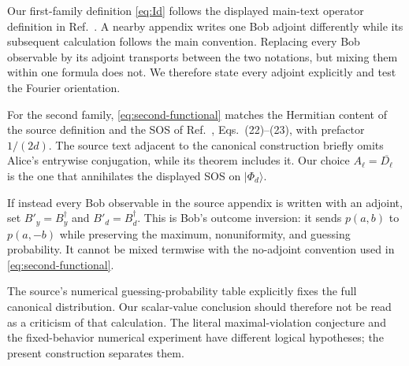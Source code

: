 \documentclass[11pt]{article}
\theoremstyle{definition}
\theoremstyle{remark}
\begin{document}
Our first-family definition \eqref{eq:Id} follows the displayed main-text
operator definition in Ref.~\cite{PeritoEtAl2026}.  A nearby appendix writes
one Bob adjoint differently while its subsequent calculation follows the
main convention.  Replacing every Bob observable by its adjoint transports
between the two notations, but mixing them within one formula does not.  We
therefore state every adjoint explicitly and test the Fourier orientation.

For the second family, \eqref{eq:second-functional} matches the Hermitian
content of the source definition and the SOS of
Ref.~\cite{PeritoEtAl2026}, Eqs.~(22)--(23), with prefactor \(1/(2d)\).
The source text adjacent to the canonical construction briefly omits Alice's
entrywise conjugation, while its theorem includes it.
Our choice \(A_\ell=\overline{D_\ell}\) is the one that annihilates the
displayed SOS on \(\lvert\Phi_d\rangle\).

If instead every Bob observable in the source appendix is written with an
adjoint, set \(B'_y=B_y^\dagger\) and \(B'_d=B_d^\dagger\).  This is Bob's
outcome inversion: it sends \(p(a,b)\) to \(p(a,-b)\) while preserving the
maximum, nonuniformity, and guessing probability.  It cannot be mixed
termwise with the no-adjoint convention used in
\eqref{eq:second-functional}.

The source's numerical guessing-probability table explicitly fixes the full
canonical distribution.  Our scalar-value conclusion should therefore not
be read as a criticism of that calculation.  The literal maximal-violation
conjecture and the fixed-behavior numerical experiment have different logical
hypotheses; the present construction separates them.
\end{document}
